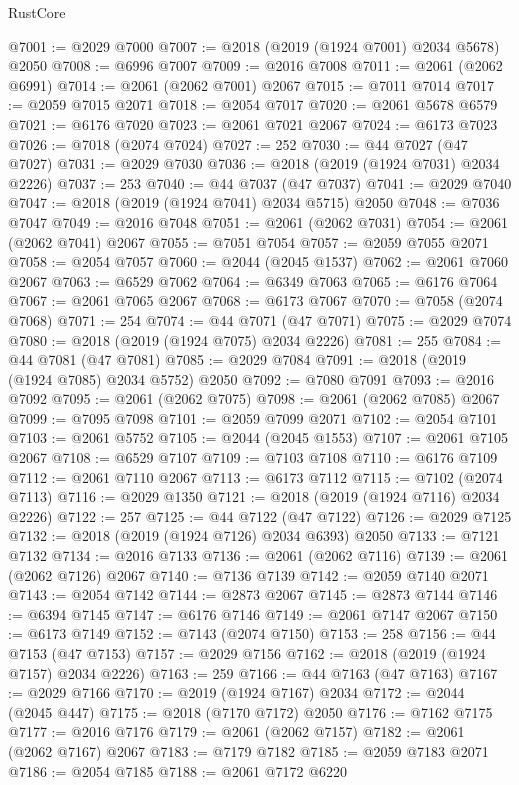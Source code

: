 \begin{lexlean}{RustCore}
\begin{coremodule}
@7001 := @2029 @7000
@7007 := @2018 (@2019 (@1924 @7001) @2034 @5678) @2050
@7008 := @6996 @7007
@7009 := @2016 @7008
@7011 := @2061 (@2062 @6991)
@7014 := @2061 (@2062 @7001) @2067
@7015 := @7011 @7014
@7017 := @2059 @7015 @2071
@7018 := @2054 @7017
@7020 := @2061 @5678 @6579
@7021 := @6176 @7020
@7023 := @2061 @7021 @2067
@7024 := @6173 @7023
@7026 := @7018 (@2074 @7024)
@7027 := 252
@7030 := @44 @7027 (@47 @7027)
@7031 := @2029 @7030
@7036 := @2018 (@2019 (@1924 @7031) @2034 @2226)
@7037 := 253
@7040 := @44 @7037 (@47 @7037)
@7041 := @2029 @7040
@7047 := @2018 (@2019 (@1924 @7041) @2034 @5715) @2050
@7048 := @7036 @7047
@7049 := @2016 @7048
@7051 := @2061 (@2062 @7031)
@7054 := @2061 (@2062 @7041) @2067
@7055 := @7051 @7054
@7057 := @2059 @7055 @2071
@7058 := @2054 @7057
@7060 := @2044 (@2045 @1537)
@7062 := @2061 @7060 @2067
@7063 := @6529 @7062
@7064 := @6349 @7063
@7065 := @6176 @7064
@7067 := @2061 @7065 @2067
@7068 := @6173 @7067
@7070 := @7058 (@2074 @7068)
@7071 := 254
@7074 := @44 @7071 (@47 @7071)
@7075 := @2029 @7074
@7080 := @2018 (@2019 (@1924 @7075) @2034 @2226)
@7081 := 255
@7084 := @44 @7081 (@47 @7081)
@7085 := @2029 @7084
@7091 := @2018 (@2019 (@1924 @7085) @2034 @5752) @2050
@7092 := @7080 @7091
@7093 := @2016 @7092
@7095 := @2061 (@2062 @7075)
@7098 := @2061 (@2062 @7085) @2067
@7099 := @7095 @7098
@7101 := @2059 @7099 @2071
@7102 := @2054 @7101
@7103 := @2061 @5752
@7105 := @2044 (@2045 @1553)
@7107 := @2061 @7105 @2067
@7108 := @6529 @7107
@7109 := @7103 @7108
@7110 := @6176 @7109
@7112 := @2061 @7110 @2067
@7113 := @6173 @7112
@7115 := @7102 (@2074 @7113)
@7116 := @2029 @1350
@7121 := @2018 (@2019 (@1924 @7116) @2034 @2226)
@7122 := 257
@7125 := @44 @7122 (@47 @7122)
@7126 := @2029 @7125
@7132 := @2018 (@2019 (@1924 @7126) @2034 @6393) @2050
@7133 := @7121 @7132
@7134 := @2016 @7133
@7136 := @2061 (@2062 @7116)
@7139 := @2061 (@2062 @7126) @2067
@7140 := @7136 @7139
@7142 := @2059 @7140 @2071
@7143 := @2054 @7142
@7144 := @2873 @2067
@7145 := @2873 @7144
@7146 := @6394 @7145
@7147 := @6176 @7146
@7149 := @2061 @7147 @2067
@7150 := @6173 @7149
@7152 := @7143 (@2074 @7150)
@7153 := 258
@7156 := @44 @7153 (@47 @7153)
@7157 := @2029 @7156
@7162 := @2018 (@2019 (@1924 @7157) @2034 @2226)
@7163 := 259
@7166 := @44 @7163 (@47 @7163)
@7167 := @2029 @7166
@7170 := @2019 (@1924 @7167) @2034
@7172 := @2044 (@2045 @447)
@7175 := @2018 (@7170 @7172) @2050
@7176 := @7162 @7175
@7177 := @2016 @7176
@7179 := @2061 (@2062 @7157)
@7182 := @2061 (@2062 @7167) @2067
@7183 := @7179 @7182
@7185 := @2059 @7183 @2071
@7186 := @2054 @7185
@7188 := @2061 @7172 @6220

\end{coremodule}
\end{lexlean}
